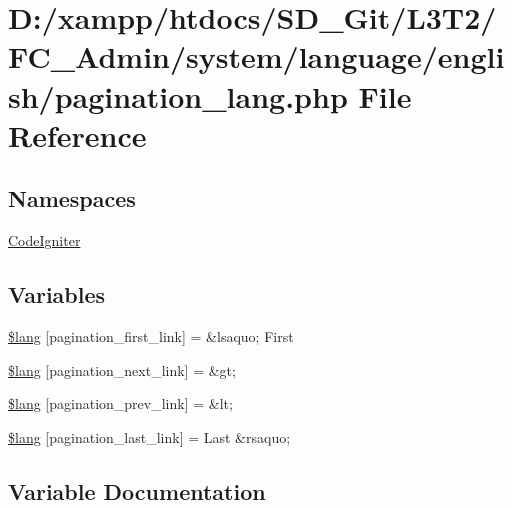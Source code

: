 \hypertarget{pagination__lang_8php}{}\section{D\+:/xampp/htdocs/\+S\+D\+\_\+\+Git/\+L3\+T2/\+F\+C\+\_\+\+Admin/system/language/english/pagination\+\_\+lang.php File Reference}
\label{pagination__lang_8php}
\subsection*{Namespaces}
\begin{DoxyCompactItemize}
\item 
 \hyperlink{namespace_code_igniter}{Code\+Igniter}
\end{DoxyCompactItemize}
\subsection*{Variables}
\begin{DoxyCompactItemize}
\item 
\hyperlink{pagination__lang_8php_a9786c3ca317374647c440f713c686d49}{\$lang} \mbox{[}\textquotesingle{}pagination\+\_\+first\+\_\+link\textquotesingle{}\mbox{]} = \textquotesingle{}\&lsaquo; First\textquotesingle{}
\item 
\hyperlink{pagination__lang_8php_a485f808a96ff78250ab760d638f3ddc7}{\$lang} \mbox{[}\textquotesingle{}pagination\+\_\+next\+\_\+link\textquotesingle{}\mbox{]} = \textquotesingle{}\&gt;\textquotesingle{}
\item 
\hyperlink{pagination__lang_8php_a5388708db9e549b8ec5ec4cd49073c84}{\$lang} \mbox{[}\textquotesingle{}pagination\+\_\+prev\+\_\+link\textquotesingle{}\mbox{]} = \textquotesingle{}\&lt;\textquotesingle{}
\item 
\hyperlink{pagination__lang_8php_aa4f66cf3f9c7c4b479f01776761faea6}{\$lang} \mbox{[}\textquotesingle{}pagination\+\_\+last\+\_\+link\textquotesingle{}\mbox{]} = \textquotesingle{}Last \&rsaquo;\textquotesingle{}
\end{DoxyCompactItemize}


\subsection{Variable Documentation}
\hypertarget{pagination__lang_8php_a9786c3ca317374647c440f713c686d49}{}
